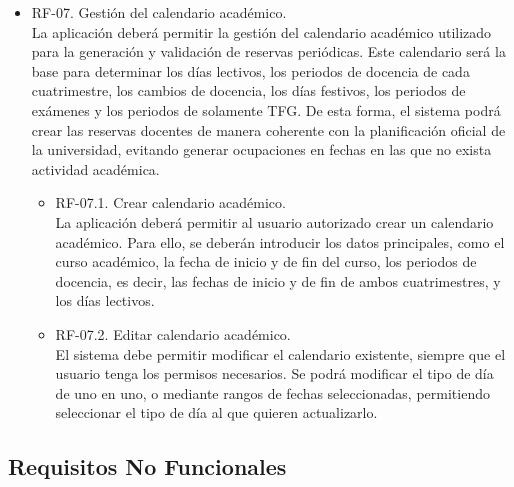 \begin{itemize}
	\item RF-07. Gestión del calendario académico.
	\\ La aplicación deberá permitir la gestión del calendario académico utilizado para la generación y validación de reservas periódicas. Este calendario será la base para determinar los días lectivos, los periodos de docencia de cada cuatrimestre, los cambios de docencia, los días festivos, los periodos de exámenes y los periodos de solamente TFG. De esta forma, el sistema podrá crear las reservas docentes de manera coherente con la planificación oficial de la universidad, evitando generar ocupaciones en fechas en las que no exista actividad académica.
	\begin{itemize}
		\item RF-07.1. Crear calendario académico.
		\\ La aplicación deberá permitir al usuario autorizado crear un calendario académico. Para ello, se deberán introducir los datos principales, como el curso académico, la fecha de inicio y de fin del curso, los periodos de docencia, es decir, las fechas de inicio y de fin de ambos cuatrimestres, y los días lectivos.
		\item RF-07.2. Editar calendario académico. 
		\\El sistema debe permitir modificar el calendario existente, siempre que el usuario tenga los permisos necesarios. Se podrá modificar el tipo de día de uno en uno, o mediante rangos de fechas seleccionadas, permitiendo seleccionar el tipo de día al que quieren actualizarlo.
	\end{itemize}
\end{itemize}

\subsection{Requisitos No Funcionales}


